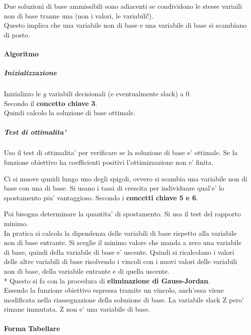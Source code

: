 Due soluzioni di base ammissibili sono adiacenti se condividono le stesse variaili non di base tranne una (non i valori, le variabili!). \\
Questo implica che una variabile non di base e una variabile di base si scambiano di posto.

\paragraph{Algoritmo}

\subparagraph{Inizializzazione}

Inizializzo le $g$ variabili decisionali (e eventualmente slack) a 0. \\
Secondo il \textbf{concetto chiave 3}. \\
Quindi calcolo la soluzione di base ottimale.

\subparagraph{Test di ottimalita'}

Uso il test di ottimalita' per verificare se la soluzione di base e' ottimale.
Se la funzione obiettivo ha coefficienti positivi l'ottimizzazione non e' finita.

Ci si muove qunidi lungo uno degli spigoli, ovvero si scambia una variabile non di base con una di base.
Si usano i tassi di crescita per individuare qual'e' lo spostamento piu' vantaggioso. Secondo i \textbf{concetti chiave 5 e 6}.

Poi bisogna determinare la quantita' di spostamento. Si usa il test del rapporto minimo. \\
In pratica si calcola la dipendenza delle variabili di base rispetto alla variabile non di base entrante.
Si sceglie il minimo valore che manda a zero una variabile di base, quindi della variabile di base e' uscente.
Quindi si ricalcolano i valori delle altre variabili di base risolvendo i vincoli con i nuovi valori delle variabili non di base, della variabile entrante e di quella uscente. \\*
Questo si fa con la procedura di \textbf{eliminazione di Gauss-Jordan}. \\

Essendo la funzione obiettivo espressa tramite un vincolo, anch'essa viene modificata nella riassegnazione della soluzione di base. La variabile slack Z pero' rimane immutata. Z non e' una variabile di base. \\

\paragraph{Forma Tabellare}

